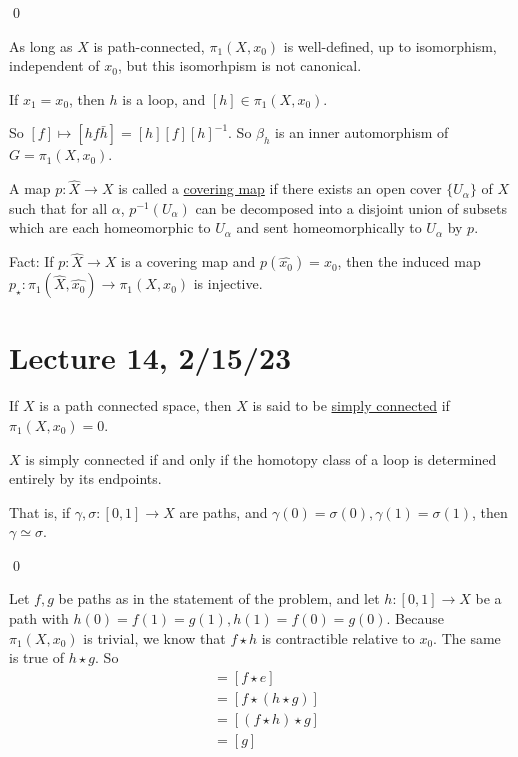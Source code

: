 \documentclass[x11names,reqno,14pt]{extarticle}
\begin{document}
\proof

\qed

\rem As long as $X$ is path-connected, $\pi_1(X, x_0)$ is well-defined, up to isomorphism, independent of $x_0$, but this isomorhpism is not canonical. 

If $x_1 = x_0$, then $h$ is a loop, and $[h]\in\pi_1(X, x_0)$. 

So $[f]\mapsto[hf\bar{h}] = [h][f][h]^{-1}$. So $\beta_h$ is an inner automorphism of $G = \pi_1(X, x_0)$. 


A map $p:\hat{X}\to X$ is called a \underline{covering map} if there exists an open cover $\{U_\alpha\}$ of $X$ such that for all $\alpha$, $p^{-1}(U_\alpha)$ can be decomposed into a disjoint union of subsets which are each homeomorphic to $U_\alpha$ and sent homeomorphically to $U_\alpha$ by $p$. 

Fact: If $p:\hat{X}\to X$ is a covering map and $p(\hat{x_0}) = x_0$, then the induced map $p_\star:\pi_1(\hat{X},\hat{x_0}) \to \pi_1(X, x_0)$ is injective. 

\section*{Lecture 14, 2/15/23}


If $X$ is a path connected space, then $X$ is said to be \underline{simply connected} if $\pi_1(X, x_0) = 0$. 

\prop

$X$ is simply connected if and only if the homotopy class of a loop is determined entirely by its endpoints. 

That is, if $\gamma, \sigma:[0,1]\to X$ are paths, and $\gamma(0) = \sigma(0), \gamma(1) = \sigma(1)$, then $\gamma \simeq \sigma$. 

\proof

\qed

Let $f, g$ be paths as in the statement of the problem, and let $h:[0,1]\to X$ be a path with $h(0) = f(1) = g(1), h(1) = f(0) = g(0)$. Because $\pi_1(X, x_0)$ is trivial, we know that $f\star h$ is contractible relative to $x_0$. The same is true of $h \star g$. So 
\begin{align*}
[f] & = [f\star e]\\
	 & = [f\star(h\star g)] \\
	 & = [(f \star h) \star g]\\
    & = [g] \\
\end{align*}
\end{document}
